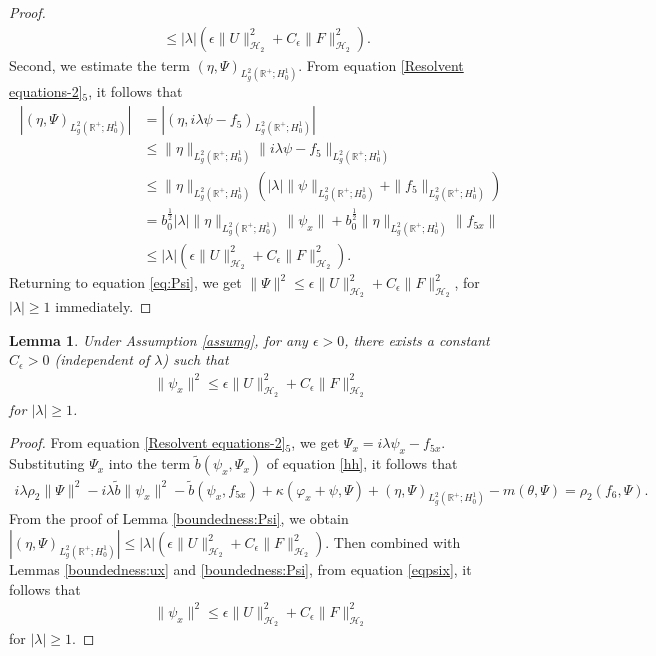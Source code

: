 \documentclass[11pt,reqno]{article}
\newtheorem{lemma}[theorem]{Lemma}
\newcommand{\dt}{\tilde}
\begin{document}
\begin{proof}
\begin{align*}
		&\leq |\lambda| \left( \epsilon \|U\|_{\mathcal{H}_2}^2 + C_{\epsilon} \|F\|_{\mathcal{H}_2}^2 \right).
	\end{align*}
	Second, we estimate the term $(\eta, \Psi)_{L_g^2(\mathbb{R}^+; H_0^1)}$. From equation \eqref{Resolvent equations-2}$_5$, it follows that
	\begin{align*}
		|(\eta, \Psi)_{L_g^2(\mathbb{R}^+; H_0^1)}| &= |(\eta, i\lambda\psi - f_5)_{L_g^2(\mathbb{R}^+; H_0^1)}| \\
		&\leq \|\eta\|_{L_g^2(\mathbb{R}^+; H_0^1)} \|i\lambda\psi - f_5\|_{L_g^2(\mathbb{R}^+; H_0^1)} \\
		&\leq \|\eta\|_{L_g^2(\mathbb{R}^+; H_0^1)} (|\lambda| \|\psi\|_{L_g^2(\mathbb{R}^+; H_0^1)} + \|f_5\|_{L_g^2(\mathbb{R}^+; H_0^1)}) \\
		&= b_0^{\frac{1}{2}} |\lambda| \|\eta\|_{L_g^2(\mathbb{R}^+; H_0^1)} \|\psi_x\| + b_0^{\frac{1}{2}} \|\eta\|_{L_g^2(\mathbb{R}^+; H_0^1)} \|f_{5x}\| \\
		&\leq |\lambda| \left( \epsilon \|U\|_{\mathcal{H}_2}^2 + C_{\epsilon} \|F\|_{\mathcal{H}_2}^2 \right).
	\end{align*}
	Returning to equation \eqref{eq:Psi}, we get $\|\Psi\|^2 \leq \epsilon\|U\|_{\mathcal{H}_2}^2 + C_{\epsilon}\|F\|_{\mathcal{H}_2}^2$, for $|\lambda| \geq 1$ immediately.
\end{proof}

\begin{lemma}\label{boundedness:psix}
	Under Assumption \ref{assumg}, for any $\epsilon>0$, there exists a constant $C_{\epsilon}>0$ (independent of $\lambda$) such that
	\begin{align}
		\|\psi_x\|^2 \leq \epsilon\|U\|_{\mathcal{H}_2}^2 + C_{\epsilon}\|F\|_{\mathcal{H}_2}^2
	\end{align}
	for $|\lambda| \geq 1$.
\end{lemma}
\begin{proof}
	From equation \eqref{Resolvent equations-2}$_5$, we get $\Psi_x = i\lambda \psi_x - f_{5x}$. Substituting $\Psi_x$ into the term $\dt b (\psi_x, \Psi_x)$ of equation \eqref{hh}, it follows that
	\begin{align}\label{eqpsix}
		i\lambda\rho_2 \|\Psi\|^2 - i\lambda \dt b \|\psi_x\|^2 - \dt b (\psi_x,f_{5x})+ \kappa(\varphi_x + \psi, \Psi) + (\eta,\Psi)_{L_g^2(\mathbb{R}^+;H_0^1)} - m(\theta, \Psi) = \rho_2 (f_6, \Psi).
	\end{align}
	From the proof of Lemma \ref{boundedness:Psi}, we obtain  $|(\eta, \Psi)_{L_g^2(\mathbb{R}^+; H_0^1)}| \leq |\lambda| \left( \epsilon \|U\|_{\mathcal{H}_2}^2 + C_{\epsilon} \|F\|_{\mathcal{H}_2}^2 \right).$ Then combined with Lemmas \ref{boundedness:ux} and \ref{boundedness:Psi}, from equation \eqref{eqpsix}, it follows that
	\begin{align*}
		\|\psi_x\|^2 \leq \epsilon\|U\|_{\mathcal{H}_2}^2 + C_{\epsilon}\|F\|_{\mathcal{H}_2}^2
	\end{align*}
	for $|\lambda| \geq 1$.
\end{proof}
\end{document}
